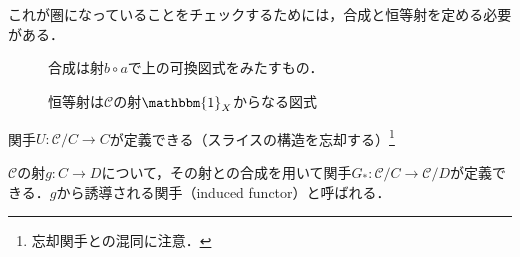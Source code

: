 \documentclass[dvipdfmx,a4j,10pt]{jsarticle}
\theoremstyle{mystyle1}
\theoremstyle{mystyle2}
\begin{document}
	これが圏になっていることをチェックするためには，合成と恒等射を定める必要がある．

	\begin{figure}[H]
		\begin{minipage}{0.45\hsize}
			\begin{center}
			\end{center}
			\caption*{合成は射$b\circ a$で上の可換図式をみたすもの．}
		\end{minipage}
		\begin{minipage}{0.45\hsize}
			\begin{center}
			\end{center}
			\caption*{恒等射は$\mathcal{C}$の射$\mathbbm{1}_X$からなる図式}
		\end{minipage}
	\end{figure}

	関手$U:\mathcal{C}/C\to C$が定義できる（スライスの構造を忘却する）\footnote{忘却関手との混同に注意．}

	\begin{center}
	\end{center}

$\mathcal{C}$の射$g:C\to D$について，その射との合成を用いて関手$G_*:\mathcal{C}/C\to \mathcal{C}/D$が定義できる．$g$から誘導される関手（induced functor）と呼ばれる．
\end{document}
